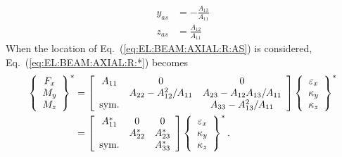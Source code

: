\begin{subequations}
\label{eq:EL:BEAM:AXIAL:R:AS}
\begin{align}
	y_{as} &= - \frac{A_{13}}{A_{11}} \\
	z_{as} &= \frac{A_{12}}{A_{11}}
\end{align}
\end{subequations}
When the location of Eq.~(\ref{eq:EL:BEAM:AXIAL:R:AS}) is considered,
Eq.~(\ref{eq:EL:BEAM:AXIAL:R:*}) becomes
\begin{align}
	\cubr{\cvvect{
		F_x \\
		M_y \\
		M_z
	}}^*
	&=
	\sqbr{\matr{ccc}{
		A_{11} & 0 & 0 \\
		& A_{22} - A_{12}^2/A_{11}
			& A_{23} - A_{12} A_{13}/A_{11} \\
		\text{sym.} & & A_{33} - A_{13}^2/A_{11}
	}}
	\cubr{\cvvect{
		\varepsilon_x \\
		\kappa_y \\
		\kappa_z \\
	}}^*
	\nonumber \\
	&=
	\sqbr{\matr{ccc}{
		A_{11}^* & 0 & 0 \\
		& A_{22}^* & A_{23}^* \\
		\text{sym.} & & A_{33}^*
	}}
	\cubr{\cvvect{
		\varepsilon_x \\
		\kappa_y \\
		\kappa_z \\
	}}^*
	.
\end{align}

